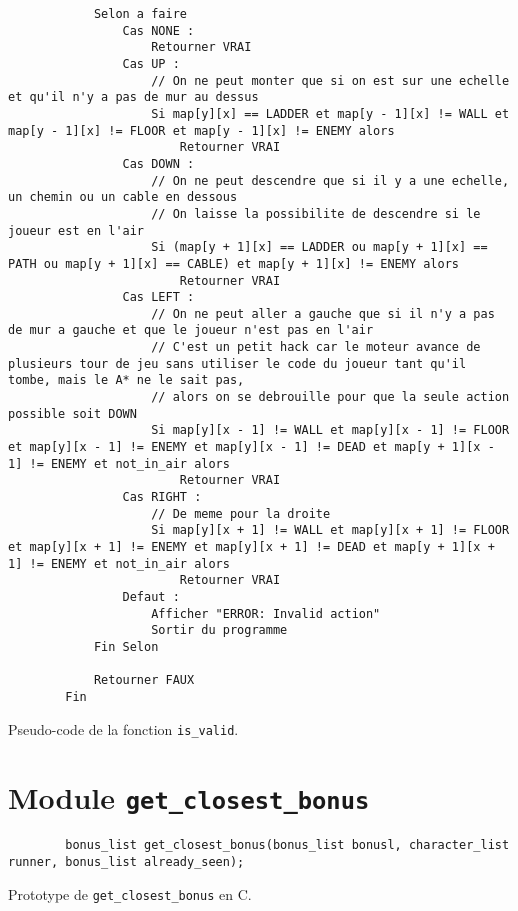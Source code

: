 \begin{longlisting}
\begin{verbatim}
            Selon a faire
                Cas NONE :
                    Retourner VRAI
                Cas UP :
                    // On ne peut monter que si on est sur une echelle et qu'il n'y a pas de mur au dessus
                    Si map[y][x] == LADDER et map[y - 1][x] != WALL et map[y - 1][x] != FLOOR et map[y - 1][x] != ENEMY alors
                        Retourner VRAI
                Cas DOWN :
                    // On ne peut descendre que si il y a une echelle, un chemin ou un cable en dessous
                    // On laisse la possibilite de descendre si le joueur est en l'air
                    Si (map[y + 1][x] == LADDER ou map[y + 1][x] == PATH ou map[y + 1][x] == CABLE) et map[y + 1][x] != ENEMY alors
                        Retourner VRAI
                Cas LEFT :
                    // On ne peut aller a gauche que si il n'y a pas de mur a gauche et que le joueur n'est pas en l'air
                    // C'est un petit hack car le moteur avance de plusieurs tour de jeu sans utiliser le code du joueur tant qu'il tombe, mais le A* ne le sait pas,
                    // alors on se debrouille pour que la seule action possible soit DOWN
                    Si map[y][x - 1] != WALL et map[y][x - 1] != FLOOR et map[y][x - 1] != ENEMY et map[y][x - 1] != DEAD et map[y + 1][x - 1] != ENEMY et not_in_air alors
                        Retourner VRAI
                Cas RIGHT :
                    // De meme pour la droite
                    Si map[y][x + 1] != WALL et map[y][x + 1] != FLOOR et map[y][x + 1] != ENEMY et map[y][x + 1] != DEAD et map[y + 1][x + 1] != ENEMY et not_in_air alors
                        Retourner VRAI
                Defaut :
                    Afficher "ERROR: Invalid action"
                    Sortir du programme
            Fin Selon

            Retourner FAUX
        Fin
    \end{verbatim}
    \caption{Pseudo-code de la fonction \texttt{is\_valid}.}
    \label{listing:c-is_valid}
\end{longlisting}

\newpage

\section{Module \texttt{get\_closest\_bonus}}

\begin{listing}[!htpb]
    \begin{verbatim}
        bonus_list get_closest_bonus(bonus_list bonusl, character_list runner, bonus_list already_seen);
    \end{verbatim}
    \caption{Prototype de \texttt{get\_closest\_bonus} en C.}
    \label{listing:c-get_closest_bonus-prototype}
\end{listing}


